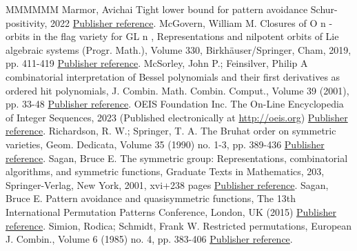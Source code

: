 \documentclass[11pt]{article}
\theoremstyle{definition}
\numberwithin{equation}{section}
\begin{document}
\begin{thebibliography}{MMMMMM}
 Marmor, Avichai Tight lower bound for pattern avoidance Schur-positivity, 2022 \href{https://alco.centre-mersenne.org/articles/10.5802/alco.351/#my_pattern_theorem}{Publisher reference}.
 McGovern, William M. Closures of O n -orbits in the flag variety for GL n , Representations and nilpotent orbits of Lie algebraic systems (Progr. Math.), Volume 330, Birkhäuser/Springer, Cham, 2019, pp. 411-419 \href{https://alco.centre-mersenne.org/articles/10.5802/alco.351/#mcgovern2019closures}{Publisher reference}.
 McSorley, John P.; Feinsilver, Philip A combinatorial interpretation of Bessel polynomials and their first derivatives as ordered hit polynomials, J. Combin. Math. Combin. Comput., Volume 39 (2001), pp. 33-48 \href{https://alco.centre-mersenne.org/articles/10.5802/alco.351/#bessel_polynomials_mathcings}{Publisher reference}.
 OEIS Foundation Inc. The On-Line Encyclopedia of Integer Sequences, 2023 (Published electronically at \url{http://oeis.org}) \href{https://alco.centre-mersenne.org/articles/10.5802/alco.351/#oeis}{Publisher reference}.
 Richardson, R. W.; Springer, T. A. The Bruhat order on symmetric varieties, Geom. Dedicata, Volume 35 (1990) no. 1-3, pp. 389-436 \href{https://alco.centre-mersenne.org/articles/10.5802/alco.351/#richardson1990bruhat}{Publisher reference}.
 Sagan, Bruce E. The symmetric group: Representations, combinatorial algorithms, and symmetric functions, Graduate Texts in Mathematics, 203, Springer-Verlag, New York, 2001, xvi+238 pages \href{https://alco.centre-mersenne.org/articles/10.5802/alco.351/#sagan_book}{Publisher reference}.
 Sagan, Bruce E. Pattern avoidance and quasisymmetric functions, The 13th International Permutation Patterns Conference, London, UK (2015) \href{https://alco.centre-mersenne.org/articles/10.5802/alco.351/#problem_find_pattern}{Publisher reference}.
 Simion, Rodica; Schmidt, Frank W. Restricted permutations, European J. Combin., Volume 6 (1985) no. 4, pp. 383-406 \href{https://alco.centre-mersenne.org/articles/10.5802/alco.351/#simion1985restricted}{Publisher reference}.
\end{thebibliography}
\end{document}
